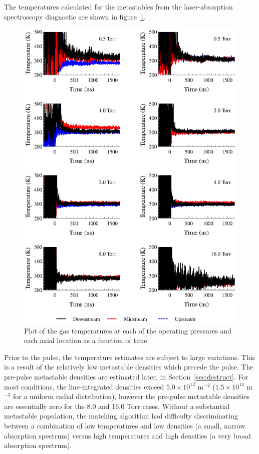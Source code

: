 The temperatures calculated for the metastables from the laser-absorption
spectroscopy diagnostic are shown in figure~\ref{fig:temperatures}.
\begin{figure}
  \centering
  \includegraphics{./chapters/metastables/figures/temperatures.eps}
  \caption{Plot of the gas temperatures at each of the operating
  pressures and each axial location as a function of time.}
  \label{fig:temperatures}
\end{figure}
Prior to the pulse, the temperature estimates are subject to large variations.
This is a result of the relatively low metastable densities which precede the
pulse. The pre-pulse metastable densities are estimated later, in
Section~\ref{sec:destruct}. For most conditions, the line-integrated densities
exceed $5.0\times10^{12}$ m$^{-2}$ ($1.5\times10^14$ m$^{-3}$ for a uniform
radial distribution), however the pre-pulse metastable densities are essentially
zero for the 8.0 and 16.0 Torr cases. Without a substantial metastable
population, the matching algorithm had difficulty discriminating between a
combination of low temperatures and low densities (a small, narrow absorption
spectrum) versus high temperatures and high densities (a very broad absorption
spectrum).

